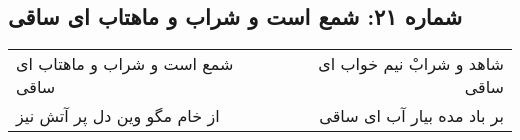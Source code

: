 \begin{center}
\section*{شماره ۲۱: شمع است و شراب و ماهتاب ای ساقی}
\label{sec:021}
\begin{longtable}{l p{0.5cm} r}
شمع است و شراب و ماهتاب ای ساقی
&&
شاهد و شرابْ نیم خواب ای ساقی
\\
از خام مگو وین دل پر آتش نیز
&&
بر باد مده بیار آب ای ساقی
\\
\end{longtable}
\end{center}
